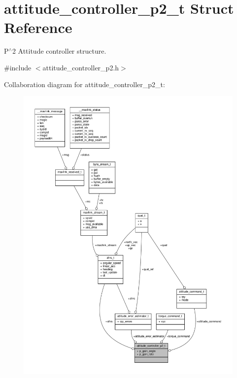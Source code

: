 \hypertarget{structattitude__controller__p2__t}{\section{attitude\+\_\+controller\+\_\+p2\+\_\+t Struct Reference}
\label{structattitude__controller__p2__t}
}


P$^\wedge$2 Attitude controller structure.  




{\ttfamily \#include $<$attitude\+\_\+controller\+\_\+p2.\+h$>$}



Collaboration diagram for attitude\+\_\+controller\+\_\+p2\+\_\+t\+:
\nopagebreak
\begin{figure}[H]
\begin{center}
\leavevmode
\includegraphics[width=350pt]{structattitude__controller__p2__t__coll__graph}
\end{center}
\end{figure}
